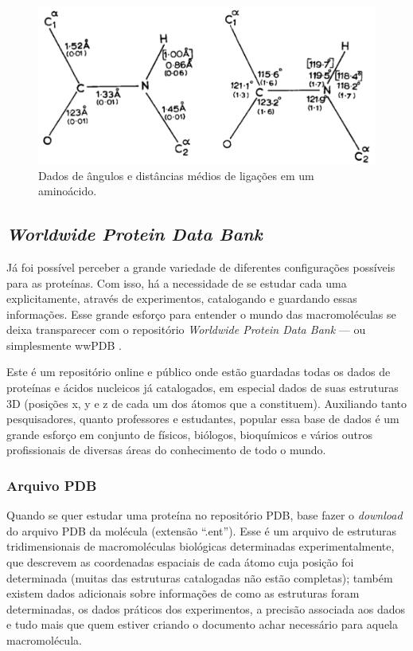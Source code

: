 \documentclass[a4paper,12pt]{article}
\begin{document}
	\begin{figure}[H]
		\begin{center}
			\includegraphics[width=0.8\linewidth]{rama.png}
		\end{center}
		\caption{Dados de ângulos e distâncias médios de ligações em um aminoácido.}
		\label{fig:rama}
	\end{figure}
	
	
	\subsection{\textit{Worldwide Protein Data Bank}}
	Já foi possível perceber a grande variedade de diferentes configurações possíveis para as proteínas. Com isso, há a necessidade de se estudar cada uma explicitamente, através de experimentos, catalogando e guardando essas informações. Esse grande esforço para entender o mundo das macromoléculas se deixa transparecer com o repositório \textit{Worldwide Protein Data Bank} --- ou simplesmente wwPDB \cite{wwPDB}.
	
	Este é um repositório online e público onde estão guardadas todas os dados de proteínas e ácidos nucleicos já catalogados, em especial dados de suas estruturas 3D (posições x, y e z de cada um dos átomos que a constituem). Auxiliando tanto pesquisadores, quanto professores e estudantes, popular essa base de dados é um grande esforço em conjunto de físicos, biólogos, bioquímicos e vários outros profissionais de diversas áreas do conhecimento de todo o mundo.
	
	\subsubsection*{Arquivo PDB}
	Quando se quer estudar uma proteína no repositório PDB, base fazer o \textit{download} do arquivo PDB da molécula (extensão ``.ent''). Esse é um arquivo de estruturas tridimensionais de macromoléculas biológicas determinadas experimentalmente, que descrevem as coordenadas espaciais de cada átomo cuja posição foi determinada (muitas das estruturas catalogadas não estão completas); também existem dados adicionais sobre informações de como as estruturas foram determinadas, os dados práticos dos experimentos, a precisão associada aos dados e tudo mais que quem estiver criando o documento achar necessário para aquela macromolécula.
	
\end{document}
